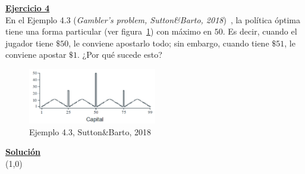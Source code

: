 \indent\underline{\textbf{Ejercicio 4}}\\
En el Ejemplo 4.3 (\textit{Gambler’s problem, Sutton\&Barto, 2018})~\cite{Sutton2018}, la política óptima tiene una forma particular (ver figura~\ref{fig:gamblers_problem}) con máximo en $50$.
Es decir, cuando el jugador tiene $\$50$, le conviene apostarlo todo; sin embargo, cuando tiene $\$51$, le
conviene apostar $\$1$.
¿Por qué sucede esto?

\begin{figure}[H]
    \centering
    \includegraphics[width=0.5\textwidth]{../img/gamblers_problem}
    \caption{Ejemplo 4.3, Sutton\&Barto, 2018}\label{fig:gamblers_problem}
\end{figure}

\indent\underline{\textbf{Solución}}\\

\line(1,0){\textwidth}
